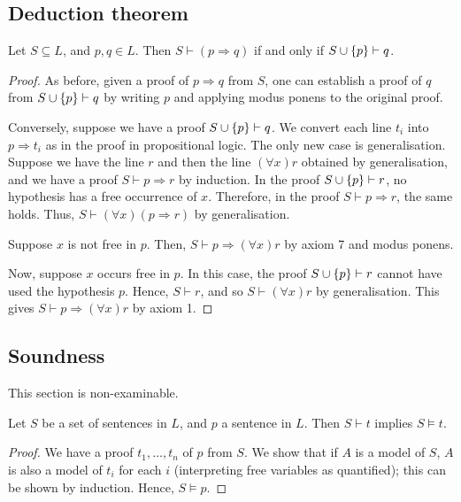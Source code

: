 \subsection{Deduction theorem}
\begin{proposition}
    Let \( S \subseteq L \), and \( p, q \in L \).
    Then \( S \vdash (p \Rightarrow q) \) if and only if \( S \cup \qty{p} \vdash q \).
\end{proposition}
\begin{proof}
    As before, given a proof of \( p \Rightarrow q \) from \( S \), one can establish a proof of \( q \) from \( S \cup \qty{p} \vdash q \) by writing \( p \) and applying modus ponens to the original proof.

    Conversely, suppose we have a proof \( S \cup \qty{p} \vdash q \).
    We convert each line \( t_i \) into \( p \Rightarrow t_i \) as in the proof in propositional logic.
    The only new case is generalisation.
    Suppose we have the line \( r \) and then the line \( (\forall x) r \) obtained by generalisation, and we have a proof \( S \vdash p \Rightarrow r \) by induction.
    In the proof \( S \cup \qty{p} \vdash r \), no hypothesis has a free occurrence of \( x \).
    Therefore, in the proof \( S \vdash p \Rightarrow r \), the same holds.
    Thus, \( S \vdash (\forall x)(p \Rightarrow r) \) by generalisation.

    Suppose \( x \) is not free in \( p \).
    Then, \( S \vdash p \Rightarrow (\forall x)r \) by axiom 7 and modus ponens.

    Now, suppose \( x \) occurs free in \( p \).
    In this case, the proof \( S \cup \qty{p} \vdash r \) cannot have used the hypothesis \( p \).
    Hence, \( S \vdash r \), and so \( S \vdash (\forall x)r \) by generalisation.
    This gives \( S \vdash p \Rightarrow (\forall x)r \) by axiom 1.
\end{proof}

\subsection{Soundness}
This section is non-examinable.
\begin{proposition}
    Let \( S \) be a set of sentences in \( L \), and \( p \) a sentence in \( L \).
    Then \( S \vdash t \) implies \( S \models t \).
\end{proposition}
\begin{proof}
    We have a proof \( t_1, \dots, t_n \) of \( p \) from \( S \).
    We show that if \( A \) is a model of \( S \), \( A \) is also a model of \( t_i \) for each \( i \) (interpreting free variables as quantified); this can be shown by induction.
    Hence, \( S \models p \).
\end{proof}

